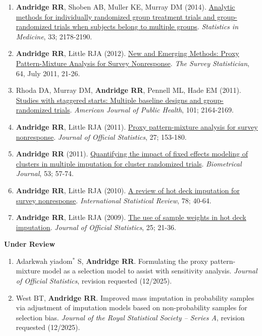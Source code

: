 \documentclass[
  english,
  letterpaper,
  DIV=11,
  numbers=noendperiod]{scrartcl}
\providecommand{\tightlist}{%
  \setlength{\itemsep}{0pt}\setlength{\parskip}{0pt}}
\begin{document}
\begin{enumerate}
{  imputation procedure for multiply imputing nonignorable missing data:
  The proxy pattern-mixture hot deck}. \emph{Computational Statistics
  and Data Analysis}, 82; 173-185.
\item
  \textbf{Andridge RR}, Shoben AB, Muller KE, Murray DM (2014).
  \href{https://doi.org/10.1002/sim.6083}{Analytic methods for
  individually randomized group treatment trials and group-randomized
  trials when subjects belong to multiple groups}. \emph{Statistics in
  Medicine}, 33; 2178-2190.
\item
  \textbf{Andridge RR}, Little RJA (2012).
  \href{https://isi-iass.org/home/wp-content/uploads/N64.pdf}{New and
  Emerging Methods: Proxy Pattern-Mixture Analysis for Survey
  Nonresponse}. \emph{The Survey Statistician}, 64, July 2011, 21-26.
\item
  Rhoda DA, Murray DM, \textbf{Andridge RR}, Pennell ML, Hade EM (2011).
  \href{https://doi.org/10.2105/AJPH.2011.300264}{Studies with staggered
  starts: Multiple baseline designs and group-randomized trials}.
  \emph{American Journal of Public Health}, 101; 2164-2169.
\item
  \textbf{Andridge RR}, Little RJA (2011).
  \href{https://www.scb.se/contentassets/ca21efb41fee47d293bbee5bf7be7fb3/proxy-pattern-mixture-analysis-for-survey-nonresponse.pdf}{Proxy
  pattern-mixture analysis for survey nonresponse}. \emph{Journal of
  Official Statistics}, 27; 153-180.
\item
  \textbf{Andridge RR} (2011).
  \href{https://doi.org/10.1002/bimj.201000140}{Quantifying the impact
  of fixed effects modeling of clusters in multiple imputation for
  cluster randomized trials}. \emph{Biometrical Journal}, 53; 57-74.
\item
  \textbf{Andridge RR}, Little RJA (2010).
  \href{https://doi.org/10.1111/j.1751-5823.2010.00103.x}{A review of
  hot deck imputation for survey nonresponse}. \emph{International
  Statistical Review}, 78; 40-64.
\item
  \textbf{Andridge RR}, Little RJA (2009).
  \href{https://www.ncbi.nlm.nih.gov/pmc/articles/PMC3117228/}{The use
  of sample weights in hot deck imputation}. \emph{Journal of Official
  Statistics}, 25; 21-36.
\end{enumerate}

\textbf{Under Review}

\begin{enumerate}
\def\labelenumi{\arabic{enumi}.}
\tightlist
\item
  Adarkwah yiadom\(^*\) S, \textbf{Andridge RR}. Formulating the proxy
  pattern-mixture model as a selection model to assist with sensitivity
  analysis. \emph{Journal of Official Statistics}, revision requested
  (12/2025).
\item
  West BT, \textbf{Andridge RR}. Improved mass imputation in probability
  samples via adjustment of imputation models based on non-probability
  samples for selection bias. \emph{Journal of the Royal Statistical
  Society -- Series A}, revision requested (12/2025).
\end{enumerate}
\end{document}
